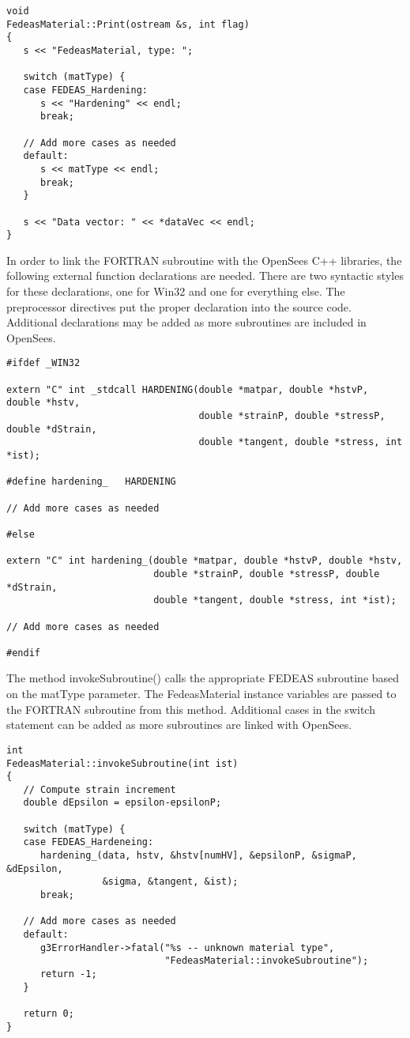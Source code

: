 \documentclass[12pt]{article}
\begin{document}
{\sf\small
\begin{verbatim}
void
FedeasMaterial::Print(ostream &s, int flag)
{
   s << "FedeasMaterial, type: ";
	
   switch (matType) {
   case FEDEAS_Hardening:
      s << "Hardening" << endl;
      break;

   // Add more cases as needed
   default:
      s << matType << endl;
      break;
   }
	
   s << "Data vector: " << *dataVec << endl;
}
\end{verbatim}
}

\noindent In order to link the FORTRAN subroutine with the OpenSees C++ libraries, the
following external function declarations are needed. There are two syntactic styles for
these declarations, one for Win32 and one for everything else. The preprocessor directives
put the proper declaration into the source code. Additional declarations may be added
as more subroutines are included in OpenSees.

{\sf\small
\begin{verbatim}
#ifdef _WIN32

extern "C" int _stdcall HARDENING(double *matpar, double *hstvP, double *hstv,
                                  double *strainP, double *stressP, double *dStrain,
                                  double *tangent, double *stress, int *ist);

#define hardening_   HARDENING

// Add more cases as needed

#else

extern "C" int hardening_(double *matpar, double *hstvP, double *hstv,
                          double *strainP, double *stressP, double *dStrain,
                          double *tangent, double *stress, int *ist);

// Add more cases as needed

#endif
\end{verbatim}
}

\noindent The method invokeSubroutine() calls the appropriate FEDEAS subroutine based
on the matType parameter. The FedeasMaterial instance variables are passed to the
FORTRAN subroutine from this method. Additional cases in the switch statement can
be added as more subroutines are linked with OpenSees.

{\sf\small
\begin{verbatim}
int
FedeasMaterial::invokeSubroutine(int ist)
{
   // Compute strain increment
   double dEpsilon = epsilon-epsilonP;

   switch (matType) {
   case FEDEAS_Hardeneing:
      hardening_(data, hstv, &hstv[numHV], &epsilonP, &sigmaP, &dEpsilon, 
                 &sigma, &tangent, &ist);
      break;

   // Add more cases as needed
   default:
      g3ErrorHandler->fatal("%s -- unknown material type",
                            "FedeasMaterial::invokeSubroutine");
      return -1;
   }

   return 0;
}
\end{verbatim}
}
\end{document}

